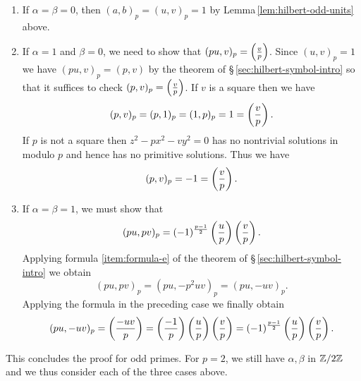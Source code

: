 \begin{enumerate}[nosep, label=(\roman*), wide]
    \item If \(\alpha = \beta = 0\), then \((a, b)_p = (u, v)_p = 1\) by
    Lemma\,\ref{lem:hilbert-odd-units} above.
    \item If \(\alpha = 1\) and \(\beta = 0\), we need to show that \((pu, v)_p
    ={ \left(\frac{v}{p}\right)}\). Since \((u, v)_p = 1\) we have \((pu, v)_p = (p,v)\)
    by the theorem of \S\,\ref{sec:hilbert-symbol-intro} so that it suffices to
    check \((p, v)_p ={\left(\frac{v}{p}\right)}\). If \(v\) is a square then we have
    \[
    (p, v)_p = (p, 1)_p = (1, p)_p = 1 = \left(\frac{v}{p}\right).
    \]
    If \(p\) is not a square then \(z^2 - px^2 - vy^2 = 0\) has no nontrivial
    solutions in modulo \(p\) and hence has no primitive solutions. Thus we have
    \[
    (p, v)_p = -1 = \left(\frac{v}{p}\right).
    \]
    \item If \(\alpha = \beta = 1\), we must show that
    \[
    (pu, pv)_p = (-1)^{\frac{p-1}{2}}\left(\frac{u}{p}\right)\left(\frac{v}{p}\right).
    \]
    Applying formula \ref{item:formula-e} of the theorem of
    \S\,\ref{sec:hilbert-symbol-intro} we obtain
    \[
    (pu, pv)_p = (pu, -p^2uv)_p = (pu, -uv)_p.
    \]
    Applying the formula in the preceding case we finally obtain
    \[
    (pu, -uv)_p = \left(\frac{-uv}{p}\right) =\left(\frac{-1}{p}\right) \left(\frac{u}{p}\right)\left(\frac{v}{p}\right) = (-1)^{\frac{p-1}{2}}\left(\frac{u}{p}\right)\left(\frac{v}{p}\right).
    \]
\end{enumerate}

This concludes the proof for odd primes. For \(p = 2\), we still have \(\alpha,
\beta\) in \(\mathbb{Z}/2\mathbb{Z}\) and we thus consider each of the three cases
above.

\smallskip

